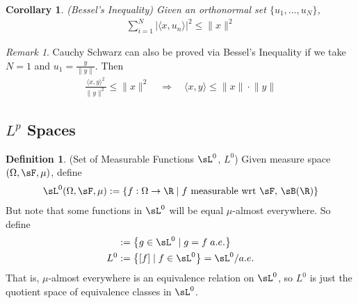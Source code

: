 \documentclass[12pt]{article}
\theoremstyle{plain}
\newtheorem{cor}[thm]{Corollary}
\theoremstyle{definition}
\newtheorem{defn}[thm]{Definition}
\theoremstyle{remark}
\newtheorem*{rmk}{Remark}
\newcommand{\ra}{\rightarrow}
\begin{document}
\begin{cor}
\emph{(Bessel's Inequality)}
Given an orthonormal set $\{u_1,\ldots,u_N\}$,
\begin{align*}
    \sum_{i=1}^N
    \bigl\lvert\langle x,u_n\rangle\bigr\rvert^2
    \leq \lVert x\rVert^2
\end{align*}
\end{cor}

\begin{rmk}
Cauchy Schwarz can also be proved via Bessel's Inequality if we take
$N=1$ and $u_1=\frac{y}{\lVert y\rVert}$. Then
\begin{align*}
    \frac{\langle x,y\rangle^2}{\lVert y\rVert^2} \leq \lVert x\rVert^2
    \quad\Rightarrow\quad
    \langle x,y\rangle \leq \lVert x\rVert\cdot \lVert y\rVert
\end{align*}
\end{rmk}


\clearpage
\subsection{$L^p$ Spaces}

\begin{defn}(Set of Measurable Functions $\sL^0$, $L^0$)
Given measure space $(\Omega,\sF,\mu)$, define
\begin{align*}
  \sL^0(\Omega,\sF,\mu) :=
  \left\{ f:\Omega\ra\R \; |\; \text{$f$ measurable wrt $\sF$, $\sB(\R)$} \right\}
\end{align*}
But note that some functions in $\sL^0$ will be equal $\mu$-almost
everywhere. So define
\begin{align*}
  [f] &:= \left\{ g\in \sL^0 \;|\; g=f \; a.e. \right\} \\
  L^0 &:= \left\{ [f] \;|\; f\in\sL^0 \right\}
  = \sL^0 / a.e.
\end{align*}
That is, $\mu$-almost everywhere is an equivalence relation on
$\sL^0$, so $L^0$ is just the quotient space of equivalence classes in
$\sL^0$.
\end{defn}
\end{document}
